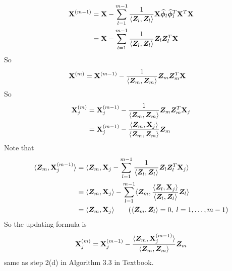 \documentclass[10pt]{article}
\theoremstyle{definition}
\theoremstyle{remark}
\newcommand{\Xb}{\mathbf{X}}
\newcommand{\bZ}{\bm{Z}}
\newcommand{\bphi}{\bm{\phi}}
\begin{document}
\begin{enumerate}
\begin{itemize}[leftmargin=*]
		\begin{align*}
		    \Xb^{(m-1)}
		    & = \Xb - \sum_{l=1}^{m-1}{ 1 \over \langle \bZ_{l}, \bZ_{l} \rangle }  \Xb\widehat{\bphi}_{l} \widehat{\bphi}_{l}^T\Xb^T \Xb \\
		    & = \Xb - \sum_{l=1}^{m-1}{ 1 \over \langle \bZ_{l}, \bZ_{l} \rangle } \bZ_{l} \bZ_{l}^T \Xb
		\end{align*}
		So
		\begin{align*}
		    \Xb^{(m)} 
		    & = \Xb^{(m-1)} - { 1 \over \langle \bZ_{m}, \bZ_{m} \rangle } \bZ_{m} \bZ_{m}^T \Xb
		\end{align*}
		So
		\begin{align*}
		    \Xb^{(m)}_{j} & = \Xb^{(m-1)}_{j} - { 1 \over \langle \bZ_{m}, \bZ_{m} \rangle } \bZ_{m} \bZ_{m}^T \Xb_{j} \\
		    & = \Xb_{j}^{(m-1)} - { \langle \bZ_{m}, \Xb_{j} \rangle \over \langle \bZ_{m}, \bZ_{m} \rangle } \bZ_{m}
		\end{align*}
		Note that
		\begin{align*}
		    \langle \bZ_{m}, \Xb^{(m-1)}_{j} \rangle
		    & = \langle \bZ_{m}, \Xb_{j} - \sum_{l=1}^{m-1}{ 1 \over \langle \bZ_{l}, \bZ_{l} \rangle } \bZ_{l} \bZ_{l}^T \Xb_{j} \rangle \\
		    & = \langle \bZ_{m}, \Xb_j \rangle - \sum_{l=1}^{m-1} \langle \bZ_{m}, { \langle \bZ_{l}, \Xb_{j} \rangle \over \langle \bZ_{l}, \bZ_{l} \rangle } \bZ_{l}  \rangle \\
		    & = \langle \bZ_{m}, \Xb_j \rangle \qquad (\langle \bZ_{m}, \bZ_{l} \rangle = 0, \; l = 1, \hdots, m-1)
		\end{align*}
		So the updating formula is
		\begin{align*}
		    \Xb^{(m)}_{j} = \Xb_{j}^{(m-1)} - { \langle \bZ_{m}, \Xb^{(m-1)}_{j} \rangle \over \langle \bZ_{m}, \bZ_{m} \rangle } \bZ_{m}
		\end{align*}
		same as step 2(d) in Algorithm 3.3 in Textbook.
		
		
	\end{itemize}
	

\end{enumerate}
\end{document}
